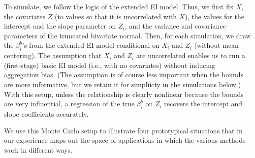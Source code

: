 \documentclass[11pt,titlepage]{article}
\begin{document}
To simulate, we follow the logic of the extended EI model.  Thus, we
first fix $X$, the covariates $Z$ (to values so that it is
uncorrelated with $X$), the values for the intercept and the slope
parameter on $Z_i$, and the variance and covariance parameters of the
truncated bivariate normal.  Then, for each simulation, we draw the
$\beta_i^b$'s from the extended EI model conditional on $X_i$ and
$Z_i$ (without mean centering).  The assumption that $X_i$ and $Z_i$
are uncorrelated enables us to run a (first-stage) basic EI model
(i.e., with no covariates) without inducing aggregation bias.  (The
assumption is of course less important when the bounds are more
informative, but we retain it for simpliicty in the simulations
below.)  With this setup, unless the relationship is clearly nonlinear
because the bounds are very influential, a regression of the true
$\beta_i^b$ on $Z_i$ recovers the intercept and slope coefficients
accurately.

We use this Monte Carlo setup to illustrate four prototypical
situations that in our experience maps out the space of applications
in which the various methods work in different ways.
\end{document}
